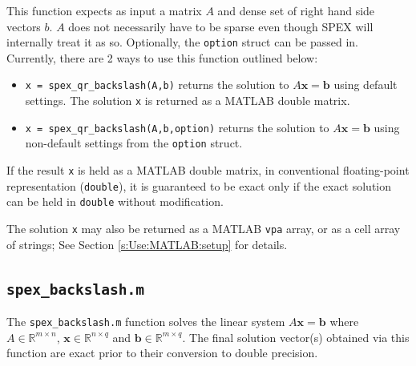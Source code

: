 \documentclass[12pt,oneside]{book}
\theoremstyle{definition}
\renewcommand{\b}{\mathbf{b}}
\newcommand{\x}{\mathbf{x}}
\begin{document}
This function expects as input a matrix $A$ and dense set of
right hand side vectors $b$. $A$ does not necessarily have to be sparse
even though SPEX will internally treat it as so.
Optionally, the \verb|option| struct can be passed in.
Currently, there are 2 ways to use this function outlined below:

\begin{itemize}

\item \verb|x = spex_qr_backslash(A,b)| returns the solution to $A \x =
\b$ using default settings. The solution \verb|x| is
returned as a MATLAB double matrix.

\item \verb|x = spex_qr_backslash(A,b,option)| returns the solution to $A \x =
\b$ using non-default settings from the \verb|option| struct.

\end{itemize}

If the result \verb|x| is held as a MATLAB double matrix, in conventional
floating-point representation (\verb|double|), it is guaranteed to be exact
only if the exact solution can be held in \verb|double| without modification.

The solution \verb|x| may also be returned as a MATLAB \verb|vpa| array, or as
a cell array of strings; See Section \ref{s:Use:MATLAB:setup} for details.

\subsection{\texttt{spex\_backslash.m}}
The \verb|spex_backslash.m| function solves the linear system $A \x = \b$ where
$A \in \mathbb{R}^{m \times n}$, $\x \in \mathbb{R}^{n \times q}$ and $\b \in
\mathbb{R}^{m \times q}$. The final solution vector(s) obtained via this
function are exact prior to their conversion to double precision.
\end{document}
